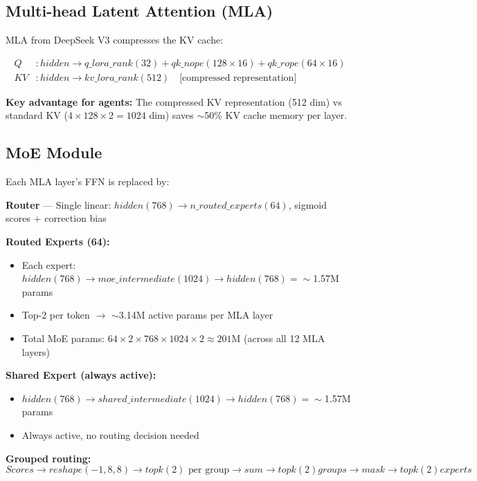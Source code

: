 \subsection{Multi-head Latent Attention (MLA)}

MLA from DeepSeek V3 \citep{deepseekv3} compresses the KV cache:

\begin{align}
    Q &: hidden \rightarrow q\_lora\_rank(32) + qk\_nope(128 \times 16) + qk\_rope(64 \times 16) \\
    KV &: hidden \rightarrow kv\_lora\_rank(512) \quad \text{[compressed representation]}
\end{align}

\textbf{Key advantage for agents:} The compressed KV representation (512 dim) vs standard KV ($4 \times 128 \times 2 = 1024$ dim) saves $\sim$50\% KV cache memory per layer.

\subsection{MoE Module}

Each MLA layer's FFN is replaced by:

\textbf{Router} --- Single linear: $hidden(768) \rightarrow n\_routed\_experts(64)$, sigmoid scores + correction bias

\textbf{Routed Experts (64):}
\begin{itemize}
    \item Each expert: $hidden(768) \rightarrow moe\_intermediate(1024) \rightarrow hidden(768) = \sim$1.57M params
    \item Top-2 per token $\rightarrow$ $\sim$3.14M active params per MLA layer
    \item Total MoE params: $64 \times 2 \times 768 \times 1024 \times 2 \approx 201$M (across all 12 MLA layers)
\end{itemize}

\textbf{Shared Expert (always active):}
\begin{itemize}
    \item $hidden(768) \rightarrow shared\_intermediate(1024) \rightarrow hidden(768) = \sim$1.57M params
    \item Always active, no routing decision needed
\end{itemize}

\textbf{Grouped routing:}
\begin{equation}
    Scores \rightarrow reshape(-1, 8, 8) \rightarrow topk(2) \text{ per group} \rightarrow sum \rightarrow topk(2) groups \rightarrow mask \rightarrow topk(2) experts
\end{equation}

